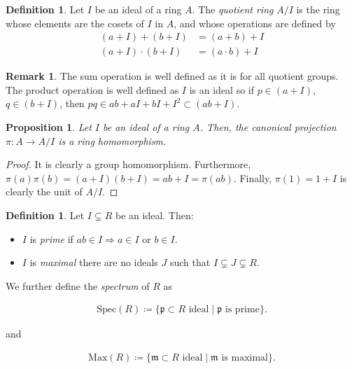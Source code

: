 \documentclass[11pt]{article}
\newtheorem{prop}[theorem]{Proposition}
\theoremstyle{definition}
\newtheorem{defn}[theorem]{Definition}
\newtheorem{rk}[theorem]{Remark}
\begin{document}
        \begin{defn}
            Let $I$ be an ideal of a ring $A$.
            The \emph{quotient ring} $A/I$ is the ring whose elements are the cosets of $I$ in $A$, and whose operations are defined by
            \begin{align}
                (a + I) + (b + I) &= (a + b) + I \nonumber \\
                (a + I) \cdot (b + I) &= (a \cdot b) + I \nonumber
            \end{align}
        \end{defn}

        \begin{rk}
            The sum operation is well defined as it is for all quotient groups.
            The product operation is well defined as $I$ is an ideal so if $p \in (a + I)$, $q \in (b + I)$,
            then $pq \in ab + aI + bI + I^2 \subset (ab + I)$.
        \end{rk}

        \begin{prop}
            Let $I$ be an ideal of a ring $A$.
            Then, the canonical projection $\pi: A \rightarrow A/I$ is a ring homomorphism.
        \end{prop}

                \begin{proof}
                    It is clearly a group homomorphism.
                    Furthermore, $\pi(a) \pi(b) = (a + I) (b + I) = ab + I = \pi(ab)$.
                    Finally, $\pi(1) = 1 + I$ is clearly the unit of $A/I$.
                \end{proof}

        \begin{defn}
            Let $I \subsetneq R$ be an ideal.
            Then:

            \begin{itemize}
                \item $I$ is \emph{prime} if $ab \in I \Rightarrow a \in I \text{ or } b \in I$.
                \item $I$ is \emph{maximal} there are no ideals $J$ such that $I \subsetneq J \subsetneq R$.
            \end{itemize}

            We further define the \emph{spectrum} of $R$ as

            \begin{align}
                \text{Spec}(R) \coloneqq \{\mathfrak{p} \subset R \text{ ideal} \mid \mathfrak{p} \text{ is prime}\}. \nonumber
            \end{align}

            and

            \begin{align}
                \text{Max}(R) \coloneqq \{\mathfrak{m} \subset R \text{ ideal} \mid \mathfrak{m} \text{ is maximal}\}. \nonumber
            \end{align}

        \end{defn}
\end{document}

